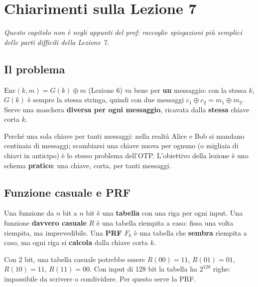 
\chapter{Chiarimenti sulla Lezione 7}

\textit{Questo capitolo non è negli appunti del prof: raccoglie spiegazioni più semplici delle parti difficili della Lezione 7.}

\section{Il problema}

\begin{inbreve}
\(\text{Enc}(k, m) = G(k) \oplus m\) (Lezione 6) va bene per \textbf{un} messaggio: con la stessa \(k\), \(G(k)\) è sempre la stessa stringa, quindi con due messaggi \(c_1 \oplus c_2 = m_1 \oplus m_2\). Serve una maschera \textbf{diversa per ogni messaggio}, ricavata dalla \textbf{stessa} chiave corta \(k\).
\end{inbreve}

Perché una sola chiave per tanti messaggi: nella realtà Alice e Bob si mandano centinaia di messaggi; scambiarsi una chiave nuova per ognuno (o migliaia di chiavi in anticipo) è lo stesso problema dell'OTP. L'obiettivo della lezione è uno schema \textbf{pratico}: una chiave, corta, per tanti messaggi.

\section{Funzione casuale e PRF}

\begin{inbreve}
Una funzione da \(n\) bit a \(n\) bit è una \textbf{tabella} con una riga per ogni input. Una funzione \textbf{davvero casuale} \(R\) è una tabella riempita a caso: fissa una volta riempita, ma imprevedibile. Una \textbf{PRF} \(F_k\) è una tabella che \textbf{sembra} riempita a caso, ma ogni riga si \textbf{calcola} dalla chiave corta \(k\).
\end{inbreve}

\begin{esempio}
Con 2 bit, una tabella casuale potrebbe essere \(R(00) = 11\), \(R(01) = 01\), \(R(10) = 11\), \(R(11) = 00\). Con input di 128 bit la tabella ha \(2^{128}\) righe: impossibile da scrivere o condividere. Per questo serve la PRF.
\end{esempio}

